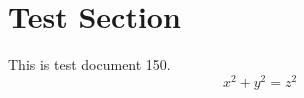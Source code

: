 \documentclass{article}
\begin{document}
\section{Test Section}
This is test document 150.
\begin{equation}
x^2 + y^2 = z^2
\end{equation}
\end{document}

